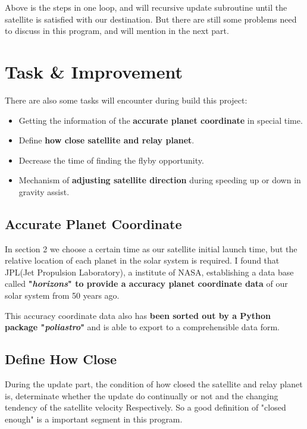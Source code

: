 \documentclass{article}
\begin{document}
\begin{multicols}{2}
Above is the steps in one loop, and will recursive update subroutine until the satellite is satisfied with our destination. But there are still some problems need to discuss in this program, and will mention in the next part.

\section{Task \& Improvement}
There are also some tasks will encounter during build this project:

\begin{itemize}
    \item Getting the information of the \textbf{accurate planet coordinate} in special time.
    \item Define \textbf{how close satellite and relay planet}.
    \item Decrease the time of finding the flyby opportunity.
    \item Mechanism of \textbf{adjusting satellite direction} during speeding up or down in gravity assist.
\end{itemize}


\subsection{Accurate Planet Coordinate}
In section 2 we choose a certain time as our satellite initial launch time, but the relative location of each planet in the solar system is required. I found that JPL(Jet Propulsion Laboratory), a institute of NASA, establishing a data base called \textbf{"\emph{horizons}"\cite{b4} to provide a accuracy planet coordinate data} of our solar system from 50 years ago.

This accuracy coordinate data also has \textbf{been sorted out by a Python package "\emph{poliastro}"\cite{b5}} and is able to export to a comprehensible data form.
 
 
\subsection{Define How Close}
During the update part, the condition of how closed the satellite and relay planet is, determinate whether the update do continually or not and the changing tendency of the satellite velocity Respectively.
So a good definition of "closed enough" is a important segment in this program.


\end{multicols}
\end{document}
